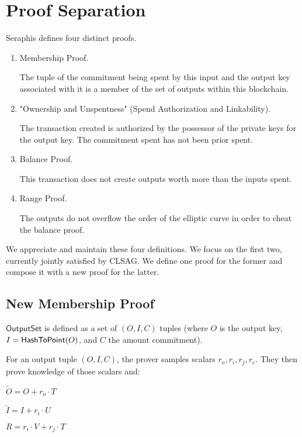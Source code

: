 \documentclass[]{article}
\begin{document}
\newpage

\section{Proof Separation}

Seraphis defines four distinct proofs.

\begin{enumerate}
	\item
	Membership Proof.
	
	The tuple of the commitment being spent by this input and the output key associated with it is a member of the set of outputs within this blockchain.

	\item "Ownership and Unspentness" (Spend Authorization and Linkability).
	
	The transaction created is authorized by the possessor of the private keys for the output key. The commitment spent has not been prior spent.
	
	\item
	Balance Proof.
	
	This transaction does not create outputs worth more than the inputs spent.
	
	\item
	Range Proof.
	
	The outputs do not overflow the order of the elliptic curve in order to cheat the balance proof.
\end{enumerate}

We appreciate and maintain these four definitions. We focus on the first two, currently jointly satisfied by CLSAG. We define one proof for the former and compose it with a new proof for the latter.

\subsection{New Membership Proof}

$\mathsf{OutputSet}$ is defined as a set of $(O, I, C)$ tuples (where $O$ is the output key, $I = \mathsf{HashToPoint}(O)$, and $C$ the amount commitment). 

For an output tuple $(O, I, C)$, the prover samples scalars $r_o, r_i, r_j, r_c$. They then prove knowledge of those scalars and:

$\tilde{O} = O + r_o \cdot T$

$\tilde{I} = I + r_i \cdot U$

$R = r_i \cdot V + r_j \cdot T$
\end{document}
